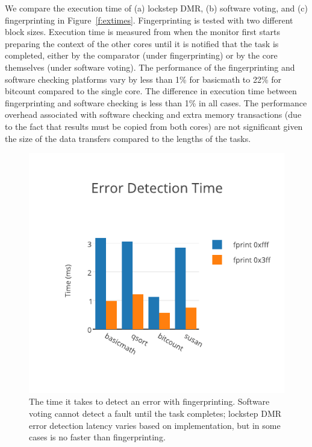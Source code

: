 	We compare the execution time of (a) lockstep DMR, (b) software voting, and (c) fingerprinting in Figure~\ref{f:extimes}.
	Fingerprinting is tested with two different block sizes.
	Execution time is measured from when the monitor first starts preparing the context of the other cores until it is notified that the task is completed, either by the comparator (under fingerprinting) or by the core themselves (under software voting).
	The performance of the fingerprinting and software checking platforms vary by less than 1\% for basicmath to 22\% for bitcount compared to the single core. The difference in execution time between fingerprinting and software checking is less than 1\% in all cases.
	The performance overhead associated with software checking and extra memory transactions (due to the fact that results must be copied from both cores) are not significant given the size of the data transfers compared to the lengths of the tasks.


\begin{figure}[tb]
\centering
\includegraphics[scale=1.5]{Figures/error_detection_time}
\caption[Error detection latency]{The time it takes to detect an error with fingerprinting. Software voting cannot detect a fault until the task completes; lockstep DMR error detection latency varies based on implementation, but in some cases is no faster than fingerprinting.}
\label{f:dettimes}
\end{figure}

